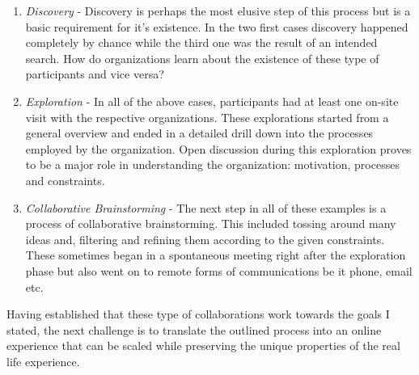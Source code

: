 \begin{enumerate}

\item \textit{Discovery} - Discovery is perhaps the most elusive step of this process but is a basic requirement for it's existence. In the two first cases discovery happened completely by chance while the third one was the result of an intended search. How do organizations learn about the existence of these type of participants and vice versa?

\item \textit{Exploration} - In all of the above cases, participants had at least one on-site visit with the respective organizations. These explorations started from a general overview and ended in a detailed drill down into the processes employed by the organization. Open discussion during this exploration proves to be a major role in understanding the organization: motivation, processes and constraints. 

\item \textit{Collaborative Brainstorming} - The next step in all of these examples is a process of collaborative brainstorming. This included tossing around many ideas and, filtering and refining them according to the given constraints. These sometimes began in a spontaneous meeting right after the exploration phase but also went on to remote forms of communications be it phone, email etc.

\end{enumerate}
 
Having established that these type of collaborations work towards the goals I stated, the next challenge is to translate the outlined process into an online experience that can be scaled while preserving the unique properties of the real life experience. 